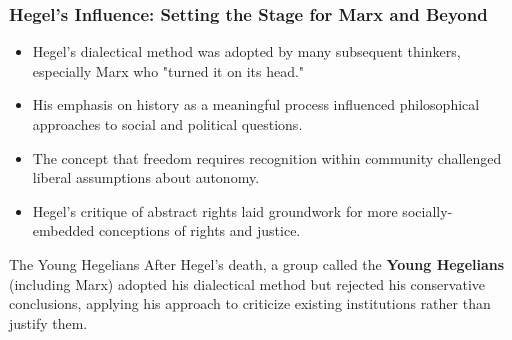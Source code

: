 \documentclass{beamer}
\begin{document}
\begin{frame}
\frametitle{Hegel's Influence: Setting the Stage for Marx and Beyond}
\begin{itemize}
    \item Hegel's dialectical method was adopted by many subsequent thinkers, especially Marx who "turned it on its head."
    \item His emphasis on history as a meaningful process influenced philosophical approaches to social and political questions.
    \item The concept that freedom requires recognition within community challenged liberal assumptions about autonomy.
    \item Hegel's critique of abstract rights laid groundwork for more socially-embedded conceptions of rights and justice.
\end{itemize}

\begin{alertblock}{The Young Hegelians}
After Hegel's death, a group called the \textbf{Young Hegelians} (including Marx) adopted his dialectical method but rejected his conservative conclusions, applying his approach to criticize existing institutions rather than justify them.
\end{alertblock}
\end{frame}
\end{document}

